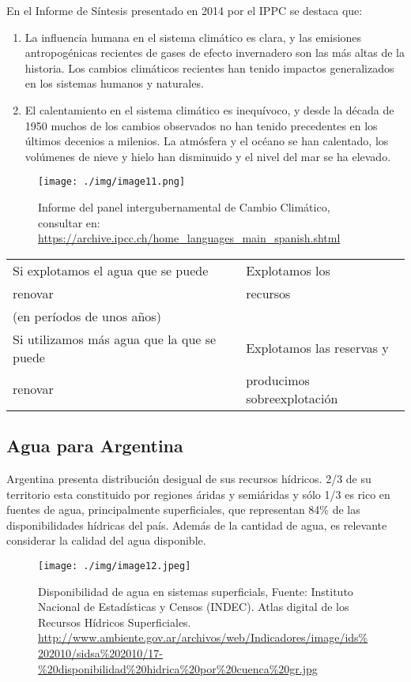 \documentclass[
  a4paper,12pt]{extarticle}
\providecommand{\tightlist}{%
  \setlength{\itemsep}{0pt}\setlength{\parskip}{0pt}}
\begin{document}
En el Informe de Síntesis presentado en 2014 por el IPPC se destaca que:

\begin{enumerate}
\tightlist
\item
  La influencia humana en el sistema climático es clara, y las emisiones
  antropogénicas recientes de gases de efecto invernadero son las más
  altas de la historia. Los cambios climáticos recientes han tenido
  impactos generalizados en los sistemas humanos y naturales.
\item
  El calentamiento en el sistema climático es inequívoco, y desde la
  década de 1950 muchos de los cambios observados no han tenido
  precedentes en los últimos decenios a milenios. La atmósfera y el
  océano se han calentado, los volúmenes de nieve y hielo han disminuido
  y el nivel del mar se ha elevado.
\end{enumerate}

\begin{figure}
\centering
\texttt{[image: ./img/image11.png]}
\caption{Informe del panel intergubernamental de Cambio Climático,
consultar en:
\url{https://archive.ipcc.ch/home_languages_main_spanish.shtml}}
\end{figure}

\begin{longtable}[]{@{}ll@{}}
\toprule
\endhead
Si explotamos el agua que se puede & Explotamos los\tabularnewline
renovar & recursos\tabularnewline
(en períodos de unos años) &\tabularnewline
Si utilizamos más agua que la que se puede & Explotamos las reservas
y\tabularnewline
renovar & producimos sobreexplotación\tabularnewline
\bottomrule
\end{longtable}

\hypertarget{agua-para-argentina}{%
\subsection{Agua para Argentina}\label{agua-para-argentina}}

Argentina presenta distribución desigual de sus recursos hídricos. 2/3
de su territorio esta constituido por regiones áridas y semiáridas y
sólo 1/3 es rico en fuentes de agua, principalmente superficiales, que
representan 84\% de las disponibilidades hídricas del país. Además de la
cantidad de agua, es relevante considerar la calidad del agua
disponible.

\begin{figure}
\centering
\texttt{[image: ./img/image12.jpeg]}
\caption{Disponibilidad de agua en sistemas superficials, Fuente:
Instituto Nacional de Estadísticas y Censos (INDEC). Atlas digital de
los Recursos Hídricos Superficiales.
\url{http://www.ambiente.gov.ar/archivos/web/Indicadores/image/ids\%202010/sidsa\%202010/17-\%20disponibilidad\%20hidrica\%20por\%20cuenca\%20gr.jpg}}
\end{figure}
\end{document}
